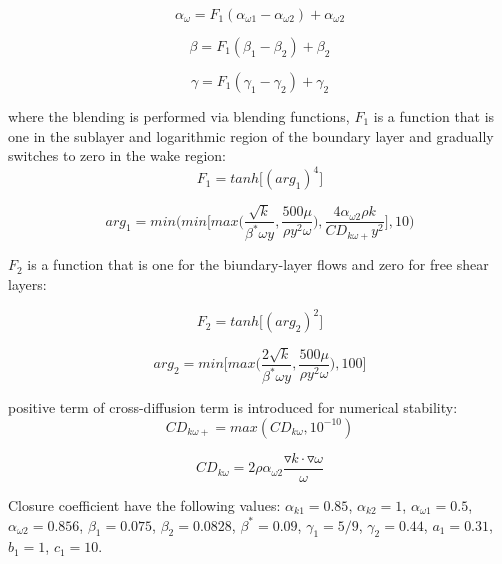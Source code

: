 \begin{equation}
{{\alpha}_{\omega}}={F_1}({{\alpha}_{\omega 1}}-{{\alpha}_{\omega 2}})+{{\alpha}_{\omega 2}}
\end{equation}

\begin{equation}
{{\beta}}={F_1}{({{\beta}_1}-{{\beta}_2})}+{{\beta}_2}
\end{equation}

\begin{equation}
{\gamma}={F_1}({{\gamma}_1}-{{\gamma}_2})+{{\gamma}_2}
\end{equation}

where the blending is performed via blending functions, $F_1$ is a
function that is one in the sublayer and logarithmic region of the
boundary layer and gradually switches to zero in the wake region:
\begin{equation}
{F_1}=tanh\bigg[(arg_1)^4 \bigg]
\end{equation}

\begin{equation}
{arg_1}=min\Bigg(min\Bigg[max\Bigg({{\frac{\sqrt{k}}{{{\beta}^*}\omega
        y}},{\frac{500\mu}{\rho
        {y^2}\omega}}\Bigg),{{\frac{4{{{\alpha}_{{\omega {2}}}}{\rho}
            {k}}}{CD_{k \omega +}{y^2}}}}\Bigg],10 }\Bigg)
\end{equation}

$F_2$ is a function that is one for the biundary-layer flows and zero
for free shear layers:

\begin{equation}
{F_2}=tanh\bigg[(arg_2)^2\bigg]
\end{equation}

\begin{equation}
{arg_2}=min\Bigg[max\Bigg({\frac{2 \sqrt{k}}{{{\beta}^*}\omega y}},
  {\frac{500 \mu}{{\rho}{y^2}{\omega}}}\Bigg),100\Bigg]
\end{equation}

positive term of cross-diffusion term is introduced for numerical
stability:
\begin{equation}
{CD_{k \omega +}}=max({CD_{k \omega}},{10}^{-10})
\end{equation}

\begin{equation}
{CD_{k \omega}}={2 \rho {\alpha}_{\omega 2}}{\frac{{\triangledown
      k}\cdot{\triangledown {\omega}}}{\omega}}
\end{equation}

Closure coefficient have the following values: ${{\alpha}_{k1}}=0.85$,
${{\alpha}_{k2}}=1$, ${{\alpha}_{\omega 1}}=0.5$, ${{\alpha}_{\omega
    2}}=0.856$, ${{\beta}_1}=0.075$, ${{\beta}_2}=0.0828$,
${{\beta}^*}=0.09$, ${{\gamma}_1}=5/9$, ${{\gamma}_2}=0.44$,
${a_1}=0.31$, ${b_1}=1$, ${c_1}=10$.

